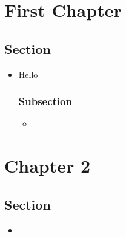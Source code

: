 \documentclass{inVerba-notes}
\begin{document}
\tableofcontents

\chapter{First Chapter}
\section{Section}
\begin{itemize}
    \item Hello
    \subsection{Subsection}
    \begin{itemize}
        \item 
    \end{itemize}
\end{itemize}
\chapter{Chapter 2}
\section{Section}
\begin{itemize}
    \item 
\end{itemize}
\end{document}
